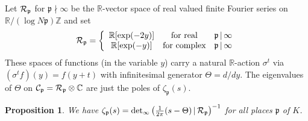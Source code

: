 \documentclass[11pt,leqno]{article}
\newcommand{\C}{{\mathbb{C}}}
\newcommand{\R}{{\mathbb{R}}}
\newcommand{\Z}{{\mathbb{Z}}}
\newcommand{\Ch}{{\cal C}}
\newcommand{\Rh}{{\cal R}}
\newcommand{\ep}{\mathfrak{p}}
\newcommand{\tei}{\, | \,}
\newtheorem{prop}[theorem]{Proposition}
\begin{document}
Let $\Rh_{\ep}$ for $\ep \nmid \infty$ be the $\R$-vector space of real valued finite Fourier series on $\R / (\log N \ep) \Z$ and set
\[
\Rh_{\ep} = \left\{ \begin{array}{ccl} 
\R [ \exp (-2y)] & \mbox{for real} & \ep \tei \infty \\
\R [\exp (-y)] & \mbox{for complex} & \ep \tei \infty
\end{array} \right.
\]
These spaces of functions (in the variable $y$) carry a natural $\R$-action $\sigma^t$ via $(\sigma^t f) (y) = f (y+t)$ with infinitesimal generator $\Theta = d / dy$. The eigenvalues of $\Theta$ on $\Ch_{\ep} = \Rh_{\ep} \otimes \C$ are just the poles of $\zeta_{\ep} (s)$.

\begin{prop} \label{t1} We have
  $\zeta_{\ep} (s) = \det_{\infty} \left( \frac{1}{2 \pi} (s - \Theta) \tei \Rh_{\ep} \right)^{-1}$ for all places $\ep$ of $K$.
\end{prop}
\end{document}
